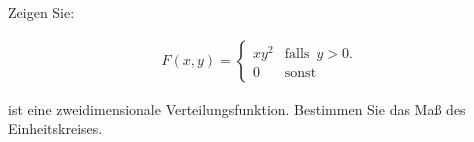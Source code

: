 
\begin{exercise}

Zeigen Sie:

\begin{align*}
  F(x, y) =
  \begin{cases}
    x y^2 & \text{falls} \enspace y > 0. \\
    0     & \text{sonst}
  \end{cases}
\end{align*}

ist eine zweidimensionale Verteilungsfunktion. Bestimmen Sie das Maß des Einheitskreises.

\end{exercise}


